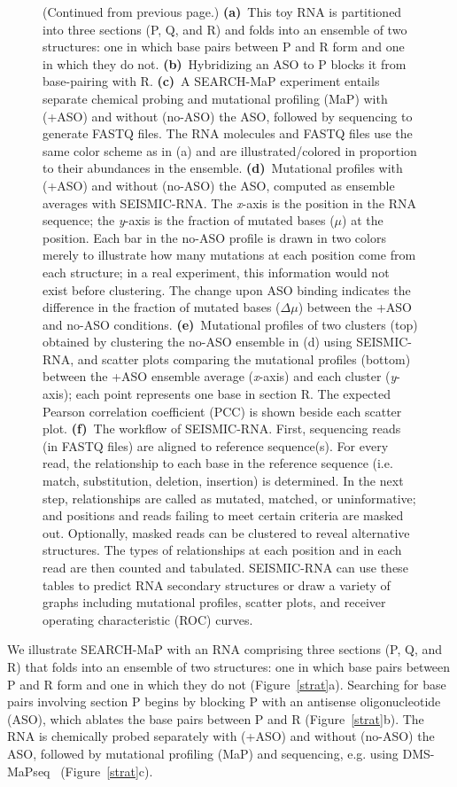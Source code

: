 \documentclass[main.tex]{subfiles}
\begin{document}
\begin{figure}[H]
	\caption[]{(Continued from previous page.) \textbf{(a)}~This toy RNA is partitioned into three sections (P, Q, and R) and folds into an ensemble of two structures: one in which base pairs between P and R form and one in which they do not. \textbf{(b)}~Hybridizing an ASO to P blocks it from base-pairing with R. \textbf{(c)}~A SEARCH-MaP experiment entails separate chemical probing and mutational profiling (MaP) with (+ASO) and without (no-ASO) the ASO, followed by sequencing to generate FASTQ files. The RNA molecules and FASTQ files use the same color scheme as in (a) and are illustrated/colored in proportion to their abundances in the ensemble. \textbf{(d)}~Mutational profiles with (+ASO) and without (no-ASO) the ASO, computed as ensemble averages with SEISMIC-RNA. The \textit{x}-axis is the position in the RNA sequence; the \textit{y}-axis is the fraction of mutated bases ($\mu$) at the position. Each bar in the no-ASO profile is drawn in two colors merely to illustrate how many mutations at each position come from each structure; in a real experiment, this information would not exist before clustering. The change upon ASO binding indicates the difference in the fraction of mutated bases ($\Delta \mu$) between the +ASO and no-ASO conditions. \textbf{(e)}~Mutational profiles of two clusters (top) obtained by clustering the no-ASO ensemble in (d) using SEISMIC-RNA, and scatter plots comparing the mutational profiles (bottom) between the +ASO ensemble average (\textit{x}-axis) and each cluster (\textit{y}-axis); each point represents one base in section R. The expected Pearson correlation coefficient (PCC) is shown beside each scatter plot. \textbf{(f)}~The workflow of SEISMIC-RNA. First, sequencing reads (in FASTQ files) are aligned to reference sequence(s). For every read, the relationship to each base in the reference sequence (i.e. match, substitution, deletion, insertion) is determined. In the next step, relationships are called as mutated, matched, or uninformative; and positions and reads failing to meet certain criteria are masked out. Optionally, masked reads can be clustered to reveal alternative structures. The types of relationships at each position and in each read are then counted and tabulated. SEISMIC-RNA can use these tables to predict RNA secondary structures or draw a variety of graphs including mutational profiles, scatter plots, and receiver operating characteristic (ROC) curves.}
\end{figure}

We illustrate SEARCH-MaP with an RNA comprising three sections (P, Q, and R) that folds into an ensemble of two structures: one in which base pairs between P and R form and one in which they do not (Figure~\ref{strat}a).
Searching for base pairs involving section P begins by blocking P with an antisense oligonucleotide (ASO), which ablates the base pairs between P and R (Figure~\ref{strat}b).
The RNA is chemically probed separately with (+ASO) and without (no-ASO) the ASO, followed by mutational profiling (MaP) and sequencing, e.g. using DMS-MaPseq~\cite{Zubradt2016} (Figure~\ref{strat}c).
\end{document}
